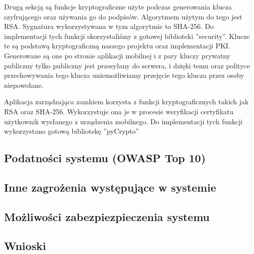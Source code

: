 Drugą sekcją są funkcje kryptograficzne użyte podczas generowania klucza szyfrującego oraz używania go do podpisów. Algorytmem użytym do tego jest RSA. Sygnatura wykorzystywana w tym algorytmie to SHA-256. Do implementacji tych funkcji skorzystaliśmy z gotowej biblioteki ''security''. Klucze te są podstawą kryptograficzną naszego projektu oraz implementacji PKI. Generowane są one po stronie aplikacji mobilnej i z pary kluczy prywatny publiczny tylko publiczny jest przesyłany do serwera, i dzięki temu oraz polityce przechowywania tego klucza uniemożliwiamy przejęcie tego klucza przez osoby niepowołane.     

Aplikacja zarządzająca zamkiem korzysta z funkcji kryptograficznych takich jak RSA oraz SHA-256. Wykorzystuje ona je w procesie weryfikacji certyfikatu użytkownik wysłanego z urządzenia mobilnego. Do implementacji tych funkcji wykorzystano gotową bibliotekę ''pyCrypto''

\newpage
\subsection[Podatności systemu (OWASP Top 10)]{Podatności systemu (OWASP Top 10) \newline [\StudentA]}

\newpage
\subsection[Inne zagrożenia występujące w systemie]{Inne zagrożenia występujące w systemie \newline [\StudentB]}

\newpage
\subsection[Możliwości zabezpiezpieczenia systemu]{Możliwości zabezpiezpieczenia systemu \newline [\StudentA]}

\newpage
\subsection{Wnioski}
 

